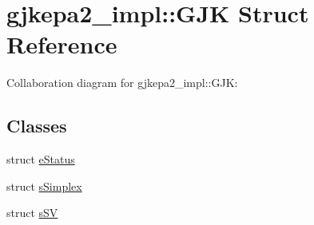 \hypertarget{structgjkepa2__impl_1_1_g_j_k}{\section{gjkepa2\+\_\+impl\+:\+:G\+J\+K Struct Reference}
\label{structgjkepa2__impl_1_1_g_j_k}
}


Collaboration diagram for gjkepa2\+\_\+impl\+:\+:G\+J\+K\+:
\subsection*{Classes}
\begin{DoxyCompactItemize}
\item 
struct \hyperlink{structgjkepa2__impl_1_1_g_j_k_1_1e_status}{e\+Status}
\item 
struct \hyperlink{structgjkepa2__impl_1_1_g_j_k_1_1s_simplex}{s\+Simplex}
\item 
struct \hyperlink{structgjkepa2__impl_1_1_g_j_k_1_1s_s_v}{s\+S\+V}
\end{DoxyCompactItemize}
